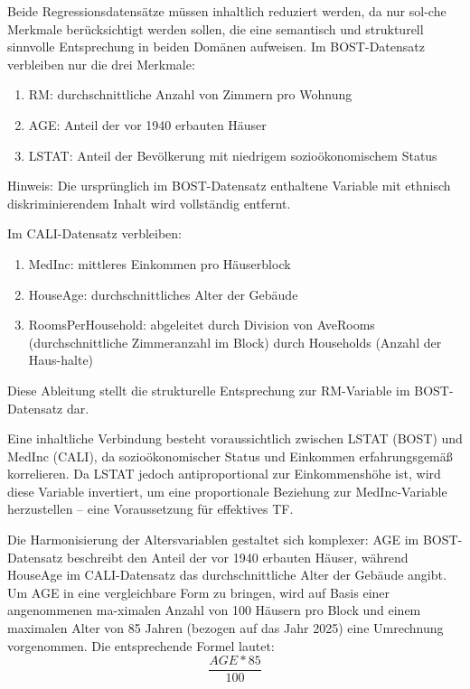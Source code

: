 Beide Regressionsdatensätze müssen inhaltlich reduziert werden, da nur sol-che Merkmale berücksichtigt werden sollen, die eine semantisch und 
strukturell sinnvolle Entsprechung in beiden Domänen aufweisen. Im BOST-Datensatz verbleiben nur die drei Merkmale:

\begin{enumerate}
    \item RM: durchschnittliche Anzahl von Zimmern pro Wohnung
    \item AGE: Anteil der vor 1940 erbauten Häuser
    \item LSTAT: Anteil der Bevölkerung mit niedrigem sozioökonomischem Status
\end{enumerate}

Hinweis: Die ursprünglich im BOST-Datensatz enthaltene Variable mit ethnisch diskriminierendem Inhalt wird vollständig entfernt.

Im CALI-Datensatz verbleiben:
\begin{enumerate}
    \item MedInc: mittleres Einkommen pro Häuserblock
    \item HouseAge: durchschnittliches Alter der Gebäude
    \item RoomsPerHousehold: abgeleitet durch Division von AveRooms (durchschnittliche Zimmeranzahl im Block) durch Households (Anzahl der Haus-halte)
\end{enumerate}

Diese Ableitung stellt die strukturelle Entsprechung zur RM-Variable im BOST-Datensatz dar.

Eine inhaltliche Verbindung besteht voraussichtlich zwischen LSTAT (BOST) und MedInc (CALI), da sozioökonomischer Status und Einkommen 
erfahrungsgemäß korrelieren. Da LSTAT jedoch antiproportional zur Einkommenshöhe ist, wird diese Variable invertiert, um eine proportionale 
Beziehung zur MedInc-Variable herzustellen – eine Voraussetzung für effektives TF.

Die Harmonisierung der Altersvariablen gestaltet sich komplexer: AGE im BOST-Datensatz beschreibt den Anteil der vor 1940 erbauten Häuser, 
während HouseAge im CALI-Datensatz das durchschnittliche Alter der Gebäude angibt. Um AGE in eine vergleichbare Form zu bringen, wird auf 
Basis einer angenommenen ma-ximalen Anzahl von 100 Häusern pro Block und einem maximalen Alter von 85 Jahren (bezogen auf das Jahr 2025) eine 
Umrechnung vorgenommen. Die entsprechende Formel lautet:
\begin{equation}
    \frac{AGE * 85}{100}
\end{equation}

